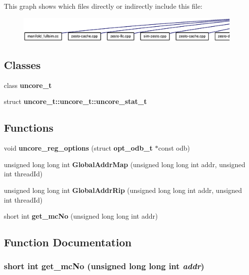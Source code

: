 This graph shows which files directly or indirectly include this file:\nopagebreak
\begin{figure}[H]
\begin{center}
\leavevmode
\includegraphics[width=420pt]{zesto-uncore_8h__dep__incl}
\end{center}
\end{figure}
\subsection*{Classes}
\begin{CompactItemize}
\item 
class {\bf uncore\_\-t}
\item 
struct {\bf uncore\_\-t::uncore\_\-t::uncore\_\-stat\_\-t}
\end{CompactItemize}
\subsection*{Functions}
\begin{CompactItemize}
\item 
void {\bf uncore\_\-reg\_\-options} (struct {\bf opt\_\-odb\_\-t} $\ast$const odb)
\item 
unsigned long long int {\bf GlobalAddrMap} (unsigned long long int addr, unsigned int threadId)
\item 
unsigned long long int {\bf GlobalAddrRip} (unsigned long long int addr, unsigned int threadId)
\item 
short int {\bf get\_\-mcNo} (unsigned long long int addr)
\end{CompactItemize}


\subsection{Function Documentation}
\subsubsection[{get\_\-mcNo}]{\setlength{\rightskip}{0pt plus 5cm}short int get\_\-mcNo (unsigned long long int {\em addr})}\label{zesto-uncore_8h_970e9d813ef774df8f5d1e7dd760f8e3}


